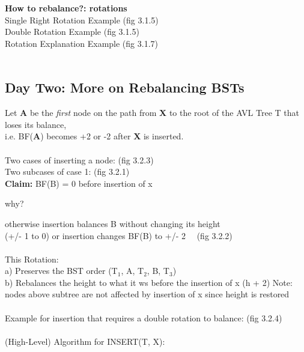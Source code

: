 \documentclass{article}
\begin{document}
			\textbf{How to rebalance?: rotations\\}
			Single Right Rotation Example (fig 3.1.5)\\
			Double Rotation Example (fig 3.1.5)\\
			Rotation Explanation Example (fig 3.1.7)\\\\
		
		\subsection{Day Two: More on Rebalancing BSTs\\}
		Let \textbf{A} be the \emph{first} node on the path from \textbf{X} to the root of the AVL Tree T that loses its balance, \\ i.e. BF(\textbf{A}) becomes +2 or -2 after \textbf{X} is inserted.\\\\
		Two cases of inserting a node: (fig 3.2.3)\\
		Two subcases of case 1: (fig 3.2.1)\\
		\textbf{Claim: } BF(B) = 0 before insertion of x
		\begin{center}
			why?\\
		\end{center}
		otherwise insertion balances B without changing its height\\ 
		(+/- 1 to 0) or insertion changes BF(B) to +/- 2 ~~(fig 3.2.2)\\\\
		This Rotation:\\
		a) Preserves the BST order (T$_1$, A, T$_2$, B, T$_3$)\\
		b) Rebalances the height to what it ws before the insertion of x (h + 2)
		Note: nodes above subtree are not affected by insertion of x since height is restored\\\\
		Example for insertion that requires a double rotation to balance: (fig 3.2.4)\\\\
		(High-Level) Algorithm for INSERT(T, X):
\end{document}
